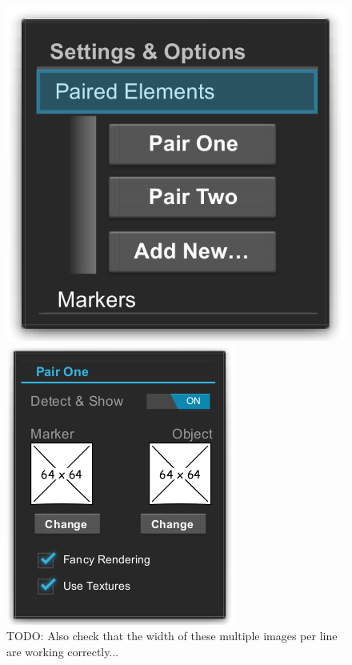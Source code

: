 \begin{figure}
	\centering
		\includegraphics[width=\linewidth]{img/menu_paired.png}
		\caption[Paired Element Menu Mockup.]{TODO: Also check that the width of these multiple images per line are working correctly...}
		\label{fig:menu_paired}
	\endminipage\hfill
		\includegraphics[width=\linewidth]{img/menu_paired_pair.png}

\end{figure}
